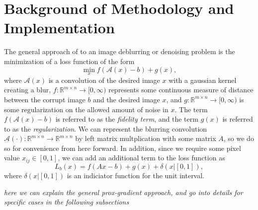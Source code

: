 \documentclass[10pt,a4paper]{article}
\newcommand{\R}{\mathbb{R}}
\begin{document}
\section{Background of Methodology and Implementation}
The general approach of to an image deblurring or denoising problem is the minimization of a loss function of the form
\begin{equation} \label{general}
 \min_x f(\mathcal{A}(x) -b) + g(x),
\end{equation}
where $\mathcal{A}(x)$ is a convolution of the desired image $x$ with a gaussian kernel creating a blur,  $f : \R^{m \times n} \rightarrow [0, \infty)$ represents some continuous measure of distance between the corrupt image $b$ and the desired image $x$, and $g:\R^{m \times n} \rightarrow [0,\infty)$ is some regularization on the allowed amount of noise in $x$. The term $f(\mathcal{A}(x)-b)$ is referred to as the \emph{fidelity term}, and the term $g(x)$ is referred to as the \emph{regularization}. We can represent the blurring convolution $\mathcal{A}(\cdot): \R^{m \times n} \rightarrow \R^{m \times n}$ by left matrix multplication with some matrix $A$, so we do so for convenience from here forward. In addition, since we require some pixel value $x_{ij} \in [0,1]$, we can add an additional term to the loss function as
\begin{equation} \label{loss}
 L_b(x) = f(Ax-b) + g(x) + \delta(x | [0,1] ),
\end{equation}
where $\delta(x | [0,1])$ is an indiciator function for the unit interval. 

\emph{here we can explain the general prox-gradient approach, and go into details for specific cases in the following subsections}

\end{document}
